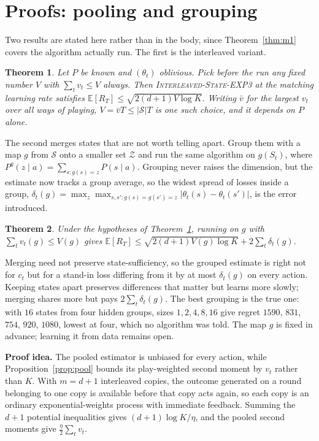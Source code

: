 \documentclass{article}
\newtheorem{theorem}{Theorem}
\theoremstyle{remark}
\newcommand{\Ex}{\mathbb{E}}
\newcommand{\Sset}{\mathcal{S}}
\begin{document}
\section{Proofs: pooling and grouping}\label{app:etc}

Two results are stated here rather than in the body, since Theorem~\ref{thm:m1} covers the
algorithm actually run. The first is the interleaved variant.

\begin{theorem}\label{thm:sexp3}
Let $P$ be known and $(\theta_t)$ oblivious. Pick before the run any fixed number $V$ with
$\sum_tv_t\le V$ always. Then \textup{\textsc{Interleaved-State-EXP3}} at the matching learning
rate satisfies $\Ex[R_T]\le\sqrt{2(d+1)V\log K}$. Writing $\bar v$ for the largest $v_t$ over all
ways of playing, $V=\bar vT\le|\Sset|T$ is one such choice, and it depends on $P$ alone.
\end{theorem}

The second merges states that are not worth telling apart. Group them with a map $g$ from $\Sset$
onto a smaller set $\mathcal Z$ and run the same algorithm on $g(S_t)$, where
$P^g(z\mid a)=\sum_{s:g(s)=z}P(s\mid a)$. Grouping never raises the dimension, but the estimate now
tracks a group average, so the widest spread of losses inside a group,
$\delta_t(g)=\max_z\max_{s,s':g(s)=g(s')=z}|\theta_t(s)-\theta_t(s')|$, is the error introduced.

\begin{theorem}\label{thm:rep}
Under the hypotheses of Theorem~\ref{thm:sexp3}, running on $g$ with $\sum_tv_t(g)\le V(g)$ gives
$\Ex[R_T]\le\sqrt{2(d+1)V(g)\log K}+2\sum_t\delta_t(g)$.
\end{theorem}

Merging need not preserve state-sufficiency, so the grouped estimate is right not for $c_t$ but for
a stand-in loss differing from it by at most $\delta_t(g)$ on every action. Keeping states apart
preserves differences that matter but learns more slowly; merging shares more but pays
$2\sum_t\delta_t(g)$. The best grouping is the true one: with $16$ states from four hidden groups,
sizes $1,2,4,8,16$ give regret $1590$, $831$, $754$, $920$, $1080$, lowest at four, which no
algorithm was told. The map $g$ is fixed in advance; learning it from data remains open.

\textbf{Proof idea.} The pooled estimator is unbiased for every action, while
Proposition~\ref{prop:pool} bounds its play-weighted second moment by $v_t$ rather than $K$. With
$m=d+1$ interleaved copies, the outcome generated on a round belonging to one copy is available
before that copy acts again, so each copy is an ordinary exponential-weights process with
immediate feedback. Summing the $d+1$ potential inequalities gives $(d+1)\log K/\eta$, and the
pooled second moments give $\tfrac\eta2\sum_tv_t$.
\end{document}
